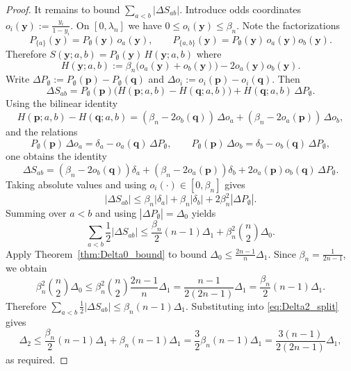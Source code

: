 \documentclass[10pt,a4paper]{amsart}
\newcommand{\abs}[1]{\left|#1\right|}
\newcommand{\lam}{\lambda}
\newcommand{\pvec}{\vct{p}}
\newcommand{\qvec}{\vct{q}}
\newcommand{\vct}[1]{\mathbf{#1}}
\newcommand{\yvec}{\vct{y}}
\begin{document}
\begin{proof}
It remains to bound $\sum_{a<b}\abs{\Delta S_{ab}}$.
Introduce odds coordinates $o_i(\yvec):=\frac{y_i}{1-y_i}$.
On $[0,\lam_n]$ we have $0\le o_i(\yvec)\le \beta_n$.
Note the factorizations
\[
P_{\{a\}}(\yvec)=P_\emptyset(\yvec)\,o_a(\yvec),\qquad
P_{\{a,b\}}(\yvec)=P_\emptyset(\yvec)\,o_a(\yvec)o_b(\yvec).
\]
Therefore $S(\yvec;a,b)=P_\emptyset(\yvec)\,H(\yvec;a,b)$ where
\[
H(\yvec;a,b):=\beta_n\big(o_a(\yvec)+o_b(\yvec)\big)-2o_a(\yvec)o_b(\yvec).
\]
Write
$\Delta P_\emptyset:=P_\emptyset(\pvec)-P_\emptyset(\qvec)$
and $\Delta o_i:=o_i(\pvec)-o_i(\qvec)$.
Then
\[
\Delta S_{ab}=P_\emptyset(\pvec)\big(H(\pvec;a,b)-H(\qvec;a,b)\big)+H(\qvec;a,b)\,\Delta P_\emptyset.
\]
Using the bilinear identity
\[
H(\pvec;a,b)-H(\qvec;a,b)
=(\beta_n-2o_b(\qvec))\,\Delta o_a+(\beta_n-2o_a(\pvec))\,\Delta o_b,
\]
and the relations
\[
P_\emptyset(\pvec)\,\Delta o_a=\delta_a-o_a(\qvec)\,\Delta P_\emptyset,
\qquad
P_\emptyset(\pvec)\,\Delta o_b=\delta_b-o_b(\qvec)\,\Delta P_\emptyset,
\]
one obtains the identity
\[
\Delta S_{ab}
=(\beta_n-2o_b(\qvec))\delta_a+(\beta_n-2o_a(\pvec))\delta_b+2o_a(\pvec)o_b(\qvec)\,\Delta P_\emptyset.
\]
Taking absolute values and using $o_i(\cdot)\in[0,\beta_n]$ gives
\[
\abs{\Delta S_{ab}}\le \beta_n\abs{\delta_a}+\beta_n\abs{\delta_b}+2\beta_n^2\abs{\Delta P_\emptyset}.
\]
Summing over $a<b$ and using $\abs{\Delta P_\emptyset}=\Delta_0$ yields
\[
\sum_{a<b}\frac12\abs{\Delta S_{ab}}
\le \frac{\beta_n}{2}(n-1)\Delta_1+\beta_n^2\binom{n}{2}\Delta_0.
\]
Apply Theorem~\ref{thm:Delta0_bound} to bound $\Delta_0\le \frac{2n-1}{n}\Delta_1$.
Since $\beta_n=\frac{1}{2n-1}$, we obtain
\[
\beta_n^2\binom{n}{2}\Delta_0
\le \beta_n^2\binom{n}{2}\frac{2n-1}{n}\Delta_1
=\frac{n-1}{2(2n-1)}\Delta_1
=\frac{\beta_n}{2}(n-1)\Delta_1.
\]
Therefore $\sum_{a<b}\frac12\abs{\Delta S_{ab}}\le \beta_n(n-1)\Delta_1$.
Substituting into \eqref{eq:Delta2_split} gives
\[
\Delta_2\le \frac{\beta_n}{2}(n-1)\Delta_1+\beta_n(n-1)\Delta_1
=\frac32\beta_n(n-1)\Delta_1
=\frac{3(n-1)}{2(2n-1)}\Delta_1,
\]
as required.
\end{proof}
\end{document}
